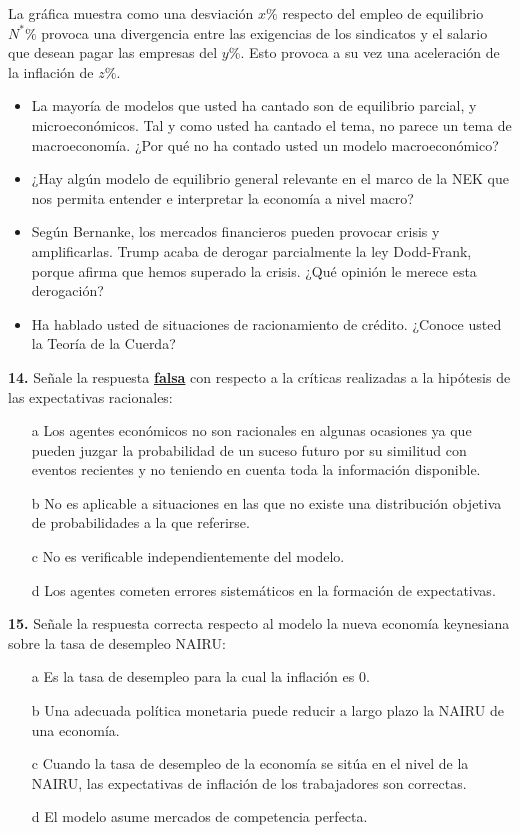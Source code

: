 \documentclass{nuevotema}
\begin{document}
La gráfica muestra como una desviación $x \%$ respecto del empleo de equilibrio $N^* \%$ provoca una divergencia entre las exigencias de los sindicatos y el salario que desean pagar las empresas del $y \%$. Esto provoca a su vez una aceleración de la inflación de $z \%$.

\preguntas


\begin{itemize}
    \item La mayoría de modelos que usted ha cantado son de equilibrio parcial, y microeconómicos. Tal y como usted ha cantado el tema, no parece un tema de macroeconomía. ¿Por qué no ha contado usted un modelo macroeconómico?
    \item ¿Hay algún modelo de equilibrio general relevante en el marco de la NEK que nos permita entender e interpretar la economía a nivel macro?
    \item Según Bernanke, los mercados financieros pueden provocar crisis y amplificarlas. Trump acaba de derogar parcialmente la ley Dodd-Frank, porque afirma que hemos superado la crisis. ¿Qué opinión le merece esta derogación?
    \item Ha hablado usted de situaciones de racionamiento de crédito. ¿Conoce usted la Teoría de la Cuerda?
\end{itemize}

\textbf{14.} Señale la respuesta \textbf{\underline{falsa}} con respecto a la críticas realizadas a la hipótesis de las expectativas racionales:
\begin{itemize}
	\item[a] Los agentes económicos no son racionales en algunas ocasiones ya que pueden juzgar la probabilidad de un suceso futuro por su similitud con eventos recientes y no teniendo en cuenta toda la información disponible.
	\item[b] No es aplicable a situaciones en las que no existe una distribución objetiva de probabilidades a la que referirse.
	\item[c] No es verificable independientemente del modelo.
	\item[d] Los agentes cometen errores sistemáticos en la formación de expectativas.
\end{itemize}

\textbf{15.} Señale la respuesta correcta respecto al modelo la nueva economía keynesiana sobre la tasa de desempleo NAIRU:
\begin{itemize}
	\item[a] Es la tasa de desempleo para la cual la inflación es 0.
	\item[b] Una adecuada política monetaria puede reducir a largo plazo la NAIRU de una economía.
	\item[c] Cuando la tasa de desempleo de la economía se sitúa en el nivel de la NAIRU, las expectativas de inflación de los trabajadores son correctas.
	\item[d] El modelo asume mercados de competencia perfecta.
\end{itemize}
\end{document}
